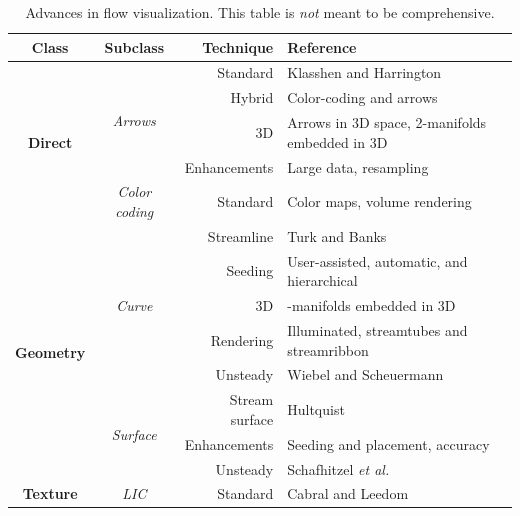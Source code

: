 \begin{table}
\caption{\label{table:progress}Advances in flow visualization. This table is \emph{not} meant to be comprehensive.}{}\centering
\begin{tabular}{c c r p{8.5cm}}
\toprule
Class &  Subclass & Technique & Reference\\
\hline
\multirow{5}{*}{\bf Direct} 	&\multirow{4}{*}{\em Arrows}		& \cc Standard  & \cc Klasshen and Harrington\cite{Klassen:1991:SHT:949607.949631} \\
					&							& \cc Hybrid  	& \cc Color-coding and arrows\cite{Kirby:1999:VMD:319351.319429}\\
					&							& \cc 3D  			& \cc Arrows in 3D space, 2-manifolds embedded in 3D\cite{Peng:2012:MVF:2086335.2086624}\\
					&							& \cc Enhancements& \cc Large data\cite{Peng:2012:MVF:2086335.2086624}, resampling\cite{Laramee2003905}\\
					&\multirow{1}{*}{\em Color coding}	&  Standard	&  Color maps, volume rendering\cite{Engel:2004:RVG:1103900.1103929}\\
\hline
\multirow{8}{*}{\bf Geometry}	&\multirow{5}{*}{\em Curve}	& \cc Streamline  	& \cc Turk and Banks\cite{Turk:1996:ISP:237170.237285}\\
						&						& \cc Seeding		& \cc User-assisted\cite{Jobard97creatingevenly-spaced}, automatic\cite{MebarkiAD05,li2008illustrative}, and hierarchical\cite{jobard2001multiresolution}\\
						&						& \cc 3D			& \cc 2-manifolds embedded in 3D\cite{spencer2009evenly}\\
						&						& \cc Rendering	& \cc Illuminated\cite{Mattausch:2003:SIE:984952.984987}, streamtubes and streamribbon\cite{Ueng:1996:ESS:614262.614333}\\
						&						& \cc Unsteady		& \cc Wiebel and Scheuermann\cite{wiebel2005eyelet}\\
						&\multirow{3}{*}{\em Surface}	& Stream surface  	& Hultquist\cite{Hultquist:1992:CSS:949685.949718}\\
						&						& Enhancements	& Seeding and placement\cite{Peikert:2009:TRS:1980462.1980472}, accuracy\cite{Garth:2008:GAI:1477066.1477441}\\
						&						& Unsteady		& Schafhitzel \emph{et al.}\cite{Schafhitzel:2007:PSS:1268517.1268564}\\
\hline
\multirow{8}{*}{\bf Texture}&\multirow{5}{*}{\em LIC}		&\cc Standard		&\cc Cabral and Leedom\cite{Cabral:1993uu} \\

\end{tabular}
\end{table}
